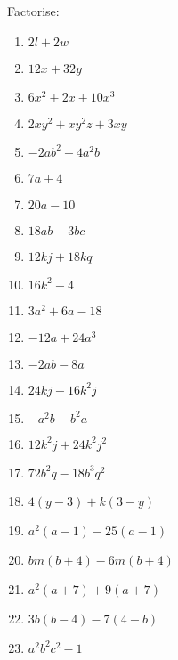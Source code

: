 \begin{exercises}{}{
Factorise:
\begin{multicols}{2}
\begin{enumerate}[itemsep=2pt, label=\textbf{\arabic*}. ] 
\item $2l+2w$
\item $12x+32y$
\item $6{x}^{2}+2x+10{x}^{3}$
\item $2x{y}^{2}+x{y}^{2}z+3xy$
\item $-2a{b}^{2}-4{a}^{2}b$
\item $7a+4$ 
\item $20a-10$ 
\item $18ab-3bc$
\item $12kj+18kq$ 
\item $16{k}^{2}-4$ 
\item $3{a}^{2}+6a-18$
\item $-12a+24a^3$ 
\item $-2ab-8a$ 
\item $24kj-16{k}^{2}j$
\item $-{a}^{2}b-{b}^{2}a$ 
\item $12{k}^{2}j+24{k}^{2}{j}^{2}$ 
\item $72{b}^{2}q-18{b}^{3}{q}^{2}$
\item $4(y-3)+k(3-y)$ 
\item $a^2(a-1)-25(a-1)$ 
\item $bm(b+4)-6m(b+4)$
\item ${a}^{2}(a+7)+9(a+7)$ 
\item $3b(b-4)-7(4-b)$ 
\item ${a}^{2}{b}^{2}{c}^{2}-1$
\end{enumerate}
\end{multicols}

}
\end{exercises}

